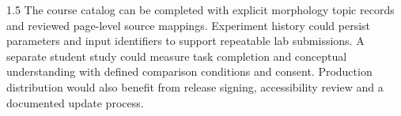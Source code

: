 \begin{spacing}{1.5}
The course catalog can be completed with explicit morphology topic records and reviewed page-level source mappings. Experiment history could persist parameters and input identifiers to support repeatable lab submissions. A separate student study could measure task completion and conceptual understanding with defined comparison conditions and consent. Production distribution would also benefit from release signing, accessibility review and a documented update process.

\end{spacing}